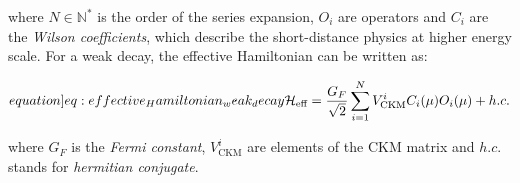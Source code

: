 where $N \in \mathbb{N}^*$ is the order of the series expansion, $O_i$ are operators and $C_i$ are the \textit{Wilson coefficients}, which describe the short-distance physics at higher energy scale.
For a weak decay, the effective Hamiltonian can be written as:

\begin{equation}\label[equation]{eq:effective_Hamiltonian_weak_decay}
    \mathcal{H}_{\text{eff}} = \frac{G_F}{\sqrt{2}} \sum_{i =1}^N V^i_{\text{CKM}} C_i(\mu) O_i(\mu) + h.c.
\end{equation}

where $G_F$ is the \textit{Fermi constant}, $V^i_{\text{CKM}}$ are elements of the \gls{CKM} matrix and $h.c.$ stands for \textit{hermitian conjugate}.